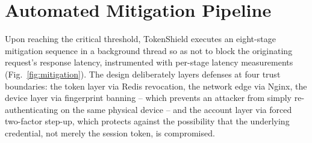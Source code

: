 \documentclass[conference]{IEEEtran}
\begin{document}
\section{Automated Mitigation Pipeline}
\label{sec:mitigation}
Upon reaching the critical threshold, TokenShield executes an eight-stage mitigation sequence in a background thread so as not to block the originating request's response latency, instrumented with per-stage latency measurements (Fig.~\ref{fig:mitigation}). The design deliberately layers defenses at four trust boundaries: the token layer via Redis revocation, the network edge via Nginx, the device layer via fingerprint banning -- which prevents an attacker from simply re-authenticating on the same physical device -- and the account layer via forced two-factor step-up, which protects against the possibility that the underlying credential, not merely the session token, is compromised.
\end{document}
